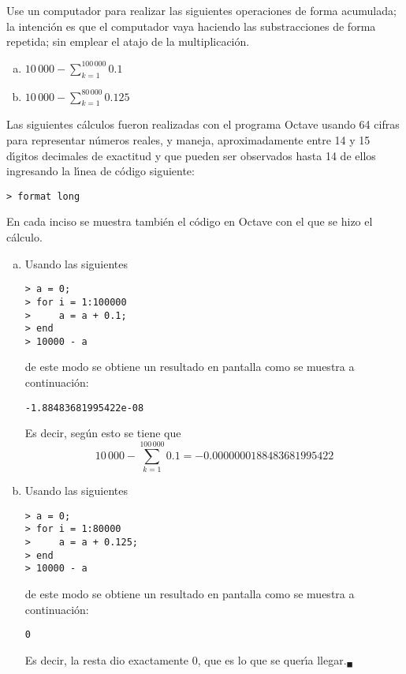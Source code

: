\begin{enunciado}
 Use un computador para realizar las siguientes operaciones de forma acumulada; la intenci\'on es que el computador vaya haciendo las substracciones de forma repetida; sin emplear el atajo de la multiplicaci\'on.
 \begin{multicols}{2}
  \begin{enumerate}[(a)]
   \item $10\,000 - \sum_{k=1}^{100\,000} 0.1$
   \item $10\,000 - \sum_{k=1}^{80\,000} 0.125$
  \end{enumerate}
 \end{multicols}
\end{enunciado}

\begin{solucion}
 Las siguientes c\'alculos fueron realizadas con el programa Octave usando 64 cifras para representar n\'umeros reales, y maneja, aproximadamente entre 14 y 15 d\'{\i}gitos decimales de exactitud y que pueden ser observados hasta 14 de ellos ingresando la l\'{\i}nea de c\'odigo siguiente:
 \begin{verbatim}
> format long
 \end{verbatim}
  \vspace{-0.5cm}
 En cada inciso se muestra tambi\'en el c\'odigo en Octave con el que se hizo el c\'alculo.
 \begin{enumerate}[(a)]
  \item Usando las siguientes
  \begin{verbatim}
> a = 0;
> for i = 1:100000
>     a = a + 0.1;
> end
> 10000 - a
  \end{verbatim}
  \vspace{-0.5cm}
  de este modo se obtiene un resultado en pantalla como se muestra a continuaci\'on:
  \begin{verbatim}
-1.88483681995422e-08
  \end{verbatim}
  \vspace{-0.5cm}
  Es decir, seg\'un esto se tiene que
  \begin{equation*}
   10\,000 - \sum_{k=1}^{100\,000} 0.1 =
   -0.0000000188483681995422
  \end{equation*}
  
  \item Usando las siguientes
  \begin{verbatim}
> a = 0;
> for i = 1:80000
>     a = a + 0.125;
> end
> 10000 - a
  \end{verbatim}
  \vspace{-0.5cm}
  de este modo se obtiene un resultado en pantalla como se muestra a continuaci\'on:
  \begin{verbatim}
0
  \end{verbatim}
  \vspace{-0.5cm}
  Es decir, la resta dio exactamente $0$, que es  lo que se quer\'{\i}a llegar.${}_{\blacksquare}$
 \end{enumerate}
\end{solucion}
